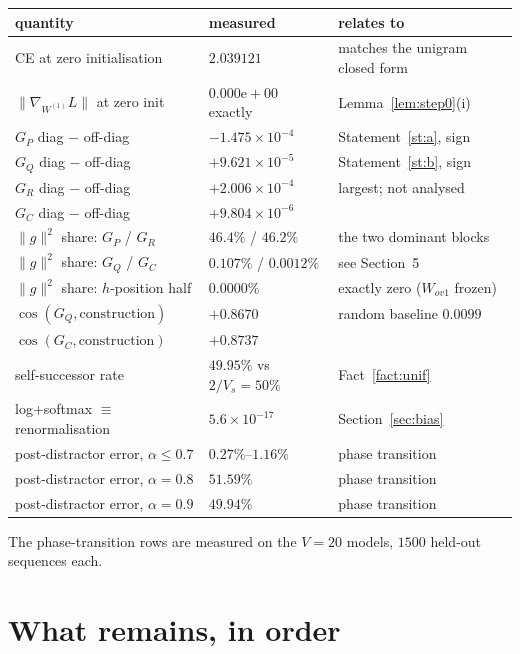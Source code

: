 \documentclass[11pt,a4paper]{article}
\theoremstyle{plain}
\theoremstyle{definition}
\newcommand{\1}{\mathbf{1}}
\begin{document}
\begin{center}
\begin{tabular}{@{}ll>{\raggedright\arraybackslash}p{5.4cm}@{}}
\toprule
quantity & measured & relates to \\
\midrule
CE at zero initialisation & $2.039121$ & matches the unigram closed form \\
$\lVert\nabla_{W^{(1)}}L\rVert$ at zero init & $0.000\mathrm{e}{+}00$ exactly & Lemma~\ref{lem:step0}(i) \\
$G_P$ diag $-$ off-diag & $-1.475\times10^{-4}$ & Statement~\ref{st:a}, sign \\
$G_Q$ diag $-$ off-diag & $+9.621\times10^{-5}$ & Statement~\ref{st:b}, sign \\
$G_R$ diag $-$ off-diag & $+2.006\times10^{-4}$ & largest; not analysed \\
$G_C$ diag $-$ off-diag & $+9.804\times10^{-6}$ & \\
$\lVert g\rVert^2$ share: $G_P$ / $G_R$ & $46.4\%$ / $46.2\%$ & the two dominant blocks \\
$\lVert g\rVert^2$ share: $G_Q$ / $G_C$ & $0.107\%$ / $0.0012\%$ & see Section~5 \\
$\lVert g\rVert^2$ share: $h$-position half & $0.0000\%$ & exactly zero ($W_{ov1}$ frozen) \\
$\cos(G_Q,\text{construction})$ & $+0.8670$ & random baseline $0.0099$ \\
$\cos(G_C,\text{construction})$ & $+0.8737$ & \\
self-successor rate & $49.95\%$ vs $2/V_s=50\%$ & Fact~\ref{fact:unif} \\
log+softmax $\equiv$ renormalisation & $5.6\times10^{-17}$ & Section~\ref{sec:bias} \\
post-distractor error, $\alpha\le0.7$ & $0.27\%$--$1.16\%$ & phase transition \\
post-distractor error, $\alpha=0.8$ & $51.59\%$ & phase transition \\
post-distractor error, $\alpha=0.9$ & $49.94\%$ & phase transition \\
\bottomrule
\end{tabular}
\end{center}

\noindent The phase-transition rows are measured on the $V=20$ models, $1500$ held-out sequences
each.

\section{What remains, in order}
\end{document}
